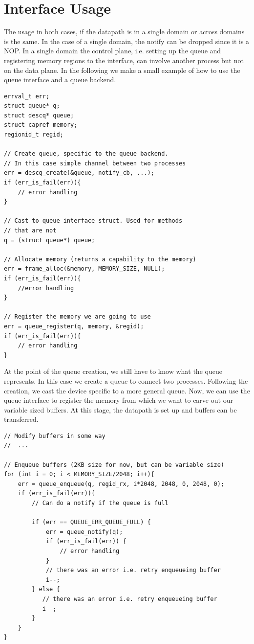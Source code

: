 \documentclass[a4paper,11pt,twoside]{report}
\begin{document}
\chapter{Interface Usage}
The usage in both cases, if the datapath is in a single domain or across domains is the same. 
In the case of a single domain, the notify can be dropped since it is a NOP. 
In a single domain the control plane, i.e. setting up the queue and registering memory 
regions to the interface, can involve another process but not on the data plane. 
In the following we make a small example of how to use the queue interface and
a queue backend. 
\begin{lstlisting}[style=code]
errval_t err;
struct queue* q;
struct descq* queue;
struct capref memory;
regionid_t regid;

// Create queue, specific to the queue backend. 
// In this case simple channel between two processes
err = descq_create(&queue, notify_cb, ...);
if (err_is_fail(err)){
    // error handling
}

// Cast to queue interface struct. Used for methods
// that are not 
q = (struct queue*) queue;

// Allocate memory (returns a capability to the memory)
err = frame_alloc(&memory, MEMORY_SIZE, NULL);
if (err_is_fail(err)){
    //error handling
}

// Register the memory we are going to use
err = queue_register(q, memory, &regid);
if (err_is_fail(err)){
    // error handling
}

\end{lstlisting}
At the point of the queue creation, we still have to know what the queue represents.
In this case we create a queue to connect two processes. Following the creation, we cast 
the device specific to a more general queue. Now, we can use the queue interface to register 
the memory from which we want to carve out our variable sized buffers. At this stage, the datapath
is set up and buffers can be transferred. 
\begin{lstlisting}[style=code]
// Modify buffers in some way
//  ...

// Enqueue buffers (2KB size for now, but can be variable size)
for (int i = 0; i < MEMORY_SIZE/2048; i++){
    err = queue_enqueue(q, regid_rx, i*2048, 2048, 0, 2048, 0);
    if (err_is_fail(err)){
        // Can do a notify if the queue is full
    
        if (err == QUEUE_ERR_QUEUE_FULL) {
            err = queue_notify(q);
            if (err_is_fail(err)) {
                // error handling
            }
            // there was an error i.e. retry enqueueing buffer
            i--;
        } else {
           // there was an error i.e. retry enqueueing buffer
           i--;
        }
    }
} 
\end{lstlisting}
\end{document}

